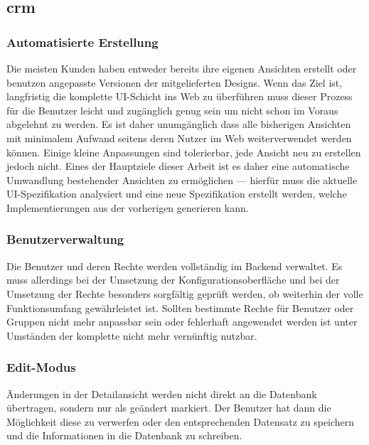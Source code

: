 \subsection{\acrlong{crm}}
\subsubsection{Automatisierte Erstellung}
Die meisten Kunden haben entweder bereits ihre eigenen Ansichten erstellt oder benutzen angepasste Versionen der mitgelieferten Designs. Wenn das Ziel ist, langfristig die komplette UI-Schicht ins Web zu überführen muss dieser Prozess für die Benutzer leicht und zugänglich genug sein um nicht schon im Voraus abgelehnt zu werden. Es ist daher unumgänglich dass alle bisherigen Ansichten mit minimalem Aufwand seitens deren Nutzer im Web weiterverwendet werden können. Einige kleine Anpassungen sind tolerierbar, jede Ansicht neu zu erstellen jedoch nicht. Eines der Hauptziele dieser Arbeit ist es daher eine automatische Umwandlung bestehender Ansichten zu ermöglichen --- hierfür muss die aktuelle UI-Spezifikation analysiert und eine neue Spezifikation erstellt werden, welche Implementierungen aus der vorherigen generieren kann.

\subsubsection{Benutzerverwaltung}
Die Benutzer und deren Rechte werden vollständig im Backend verwaltet. Es muss allerdings bei der Umsetzung der Konfigurationsoberfläche und bei der Umsetzung der Rechte besonders sorgfältig geprüft werden, ob weiterhin der volle Funktionsumfang gewährleistet ist. Sollten bestimmte Rechte für Benutzer oder Gruppen nicht mehr anpassbar sein  oder fehlerhaft angewendet werden ist unter Umständen der komplette  nicht mehr vernünftig nutzbar.

\subsubsection{Edit-Modus}
Änderungen in der Detailansicht werden nicht direkt an die Datenbank übertragen, sondern nur als geändert markiert. Der Benutzer hat dann die Möglichkeit diese zu verwerfen oder den entsprechenden Datensatz zu speichern und die Informationen in die Datenbank zu schreiben.


